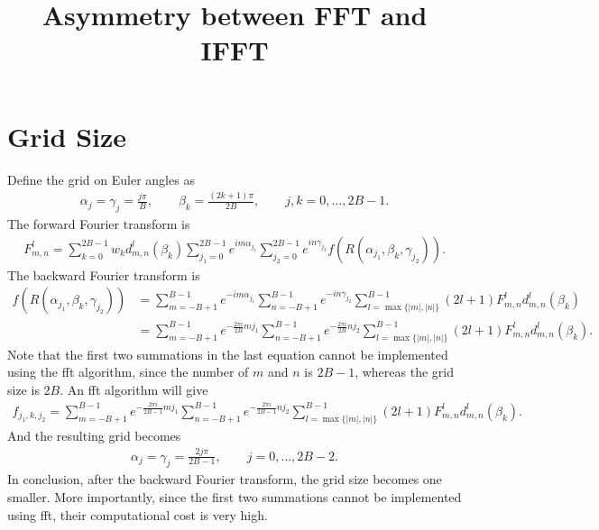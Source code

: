 \documentclass[10pt]{article}
\title{\vspace{-4ex}\textbf{Asymmetry between FFT and IFFT\vspace{-4ex}}}
\date{}
\begin{document}
\maketitle

\section{Grid Size}

Define the grid on Euler angles as
\begin{align*}
	\alpha_j = \gamma_j = \frac{j\pi}{B}, \qquad \beta_k = \frac{(2k+1)\pi}{2B}, \qquad j,k=0,\ldots,2B-1.
\end{align*}
The forward Fourier transform is
\begin{align*}
	F_{m,n}^l = \sum_{k=0}^{2B-1} w_k d_{m,n}^l(\beta_k) \sum_{j_1=0}^{2B-1}e^{im\alpha_{j_1}} \sum_{j_2=0}^{2B-1} e^{in\gamma_{j_2}} f(R(\alpha_{j_1},\beta_k,\gamma_{j_2})).
\end{align*}
The backward Fourier transform is
\begin{align*}
	f(R(\alpha_{j_1},\beta_k,\gamma_{j_2})) &= \sum_{m=-B+1}^{B-1} e^{-im\alpha_{j_1}} \sum_{n=-B+1}^{B-1} e^{-in\gamma_{j_2}} \sum_{l=\max\{|m|,|n|\}}^{B-1} (2l+1)F_{m,n}^l d_{m,n}^l(\beta_k) \\
	&= \sum_{m=-B+1}^{B-1} e^{-\frac{2\pi i}{2B}mj_1} \sum_{n=-B+1}^{B-1} e^{-\frac{2\pi i}{2B}nj_2} \sum_{l=\max\{|m|,|n|\}}^{B-1} (2l+1)F_{m,n}^l d_{m,n}^l(\beta_k).
\end{align*}
Note that the first two summations in the last equation cannot be implemented using the fft algorithm, since the number of $m$ and $n$ is $2B-1$, whereas the grid size is $2B$.
An fft algorithm will give
\begin{align*}
	f_{j_1,k,j_2} = \sum_{m=-B+1}^{B-1} e^{-\frac{2\pi i}{2B-1}mj_1} \sum_{n=-B+1}^{B-1} e^{-\frac{2\pi i}{2B-1}nj_2} \sum_{l=\max\{|m|,|n|\}}^{B-1} (2l+1)F_{m,n}^l d_{m,n}^l(\beta_k).
\end{align*}
And the resulting grid becomes
\begin{align*}
	\alpha_j = \gamma_j = \frac{2j\pi}{2B-1}, \qquad j = 0,\ldots,2B-2.
\end{align*}
In conclusion, after the backward Fourier transform, the grid size becomes one smaller.
More importantly, since the first two summations cannot be implemented using fft, their computational cost is very high.
\end{document}
